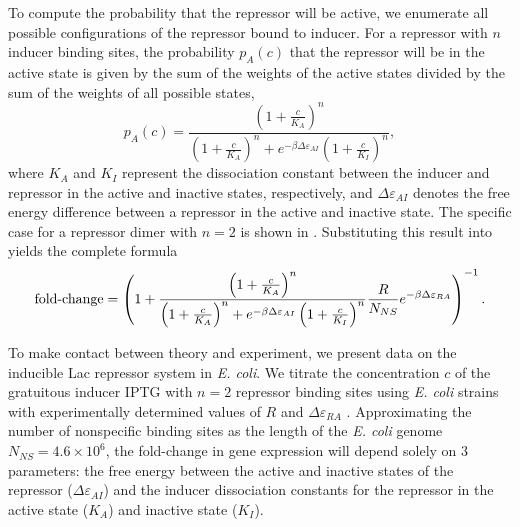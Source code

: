 To compute the probability that the repressor will be active, we enumerate all
possible configurations of the repressor bound to inducer. For a repressor with
$n$ inducer binding sites, the probability $p_A(c)$ that the repressor will be
in the active state is given by the sum of the weights of the active states
divided by the sum of the weights of all possible states,
\begin{equation}\label{eq6}
p_A(c)=\frac{\left(1+\frac{c}{K_A}\right)^n}{\left(1+\frac{c}{K_A}\right)^n+e^{-\beta  \Delta \varepsilon_{AI} }\left(1+\frac{c}{K_I}\right)^n},
\end{equation}
where $K_A$ and $K_I$ represent the dissociation constant between the inducer
and repressor in the active and inactive states, respectively, and $\Delta
\varepsilon_{AI}$ denotes the free energy difference between a repressor in the
active and inactive state. The specific case for a repressor dimer with $n=2$ is
shown in \fref[figrepressorInducerStates]. %
Substituting this result into \eref[eq5] yields the
complete formula 
\begin{equation}\label{eq7}
\operatorname{fold-change}= \left(
1+\frac{\left(1+\frac{c}{K_A}\right)^n}{\left(1+\frac{c}{K_A}\right)^n+e^{-\beta  \Delta \varepsilon_{AI} }\left(1+\frac{c}{K_I}\right)^n}\frac{R}{N_{NS}}e^{-\beta \Delta\varepsilon_{RA}} \right)^{-1}.
\end{equation}

To make contact between theory and experiment, we present data on the inducible
Lac repressor system in \textit{E. coli}. We titrate the concentration \(c\) of
the gratuitous inducer IPTG with $n=2$ repressor binding sites using \textit{E.
	coli} strains with experimentally determined values of $R$ and
$\Delta\varepsilon_{RA}$ \cite{Garcia2011}. Approximating the number of
nonspecific binding sites as the length of the \textit{E. coli} genome $N_{NS} =
4.6 \times 10^6$, the fold-change in gene expression will depend solely on 3
parameters: the free energy between the active and inactive states of the
repressor ($\Delta\varepsilon_{AI}$) and the inducer dissociation constants for
the repressor in the active state ($K_A$) and inactive state ($K_I$).


